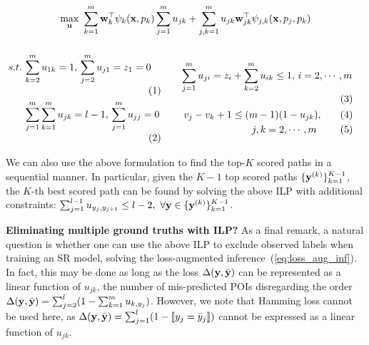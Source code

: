 \begin{equation}\eqmoveup
\label{eq:obj}
\max_{\bu} ~\sum_{k=1}^m \w_k^\top \psi_k(\x, p_k) \sum_{j=1}^m u_{jk} +
            \sum_{j,k=1}^m u_{jk} \w_{jk}^\top \psi_{j, k}(\x, p_j, p_k)
\eqmoveup
\end{equation}
{$\displaystyle
\begin{minipage}{0.45\linewidth}
\begin{alignat}{2}
s.t. \, 
& \sum_{k=2}^m u_{1k} = 1, \, \sum_{j=2}^m u_{j1} = z_1=0                 \label{eq:cons1} \\
& \sum_{j=1}^m \sum_{k=1}^m u_{jk} = l-1, \, \sum_{j=1}^m u_{jj}=0        \label{eq:cons2}
\end{alignat}
\end{minipage}
\qquad
\begin{minipage}{0.5\linewidth}
\begin{alignat}{3}
\sum_{j=1}^m u_{ji} = z_i &+ \sum_{k=2}^m u_{ik} \le 1, \, i = 2,\cdots,m  \label{eq:cons3} \\
v_j - v_k + 1 &\le (m-1) (1-u_{jk}),                                       \nonumber \\
              & \qquad j,k = 2,\cdots,m                                    \label{eq:cons4}
\end{alignat}
\end{minipage}
$}\eqmoveup

We can also use the above formulation to find the top-$K$ scored paths in a sequential manner. 
In particular, given the $K\!-\!1$ top scored paths $\{\mathbf{y}^{({k})}\}_{k=1}^{K-1}$, 
the $K\!$-th best scored path can be found by solving the above ILP with additional constraints:
$\sum_{j=1}^{l-1} u_{y_j, y_{j+1}} \le l-2, ~\forall \mathbf{y} \in \{\mathbf{y}^{(k)}\}_{k=1}^{K-1}$.

\textbf{Eliminating multiple ground truths with ILP?}
As a final remark, a natural question is whether one can use the above ILP 
to exclude observed labels when training an SR model,
\ie solving the loss-augmented inference~(\ref{eq:loss_aug_inf}).
In fact, this may be done
as long as the loss $\Delta(\mathbf{y},\bar{\mathbf{y}})$ can be represented as a linear function of $u_{jk}$,
\eg the number of mis-predicted POIs disregarding the order $\Delta(\mathbf{y}, \bar{\mathbf{y}}) = \sum_{j=2}^l (1 - \sum_{k=1}^m u_{k, y_j})$.
However, we note that Hamming loss %
cannot be used here, as $\Delta(\mathbf{y},\bar{\mathbf{y}}) = \sum_{j=1}^l (1 - \llbracket y_j = \bar y_j \rrbracket)$
cannot be expressed as a linear function of $u_{jk}$.

